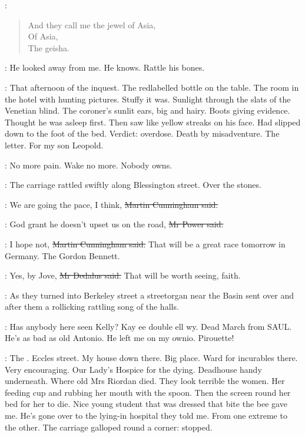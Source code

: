 \BloomInt:
\begin{verse}
    And they call me the jewel of Asia, \\
    Of Asia, \\
    The geisha.
\end{verse}

\BloomInt:
He looked away from me.
He knows.
Rattle his bones.

\BloomInt:
That afternoon of the inquest.
The redlabelled bottle on the table.
The room in the hotel with hunting pictures.
Stuffy it was.
Sunlight through the slats of the Venetian blind.
The coroner's sunlit ears, big and hairy.
Boots giving evidence.
Thought he was asleep first.
Then saw like yellow streaks on his face.
Had slipped down to the foot of the bed.
Verdict:
overdose.
Death by misadventure.
The letter.
For my son Leopold.

\BloomInt:
No more pain.
Wake no more.
Nobody owns.

:
The carriage rattled swiftly along Blessington street.
Over the stones.

\cunningham:
We are going the pace, I think,
\sout{Martin Cunningham said.}

\power:
God grant he doesn't upset us on the road,
\sout{Mr Power said.}

\cunningham:
I hope not,
\sout{Martin Cunningham said.}
That will be a great race tomorrow in Germany.
The Gordon Bennett.

\simon:
Yes, by Jove,
\sout{Mr Dedalus said.}
That will be worth seeing, faith.

:
As they turned into Berkeley street
a streetorgan near the Basin sent over and after them
a rollicking rattling song of the halls.

:
Has anybody here seen Kelly?
Kay ee double ell wy.
Dead March from SAUL.
He's as bad
as old Antonio.
He left me on my ownio.
Pirouette!

\BloomInt:
The .
Eccles street.
My house down there.
Big place.
Ward for incurables there.
Very encouraging.
Our Lady's Hospice for the dying.
Deadhouse handy underneath.
Where old Mrs Riordan died.
They look terrible the women.
Her feeding cup and rubbing her mouth with the spoon.
Then the screen round her bed for her to die.
Nice young student that was dressed that bite the bee gave me.
He's gone over to the lying-in hospital they told me.
From one extreme to the other.
The carriage galloped round a corner:
stopped.

